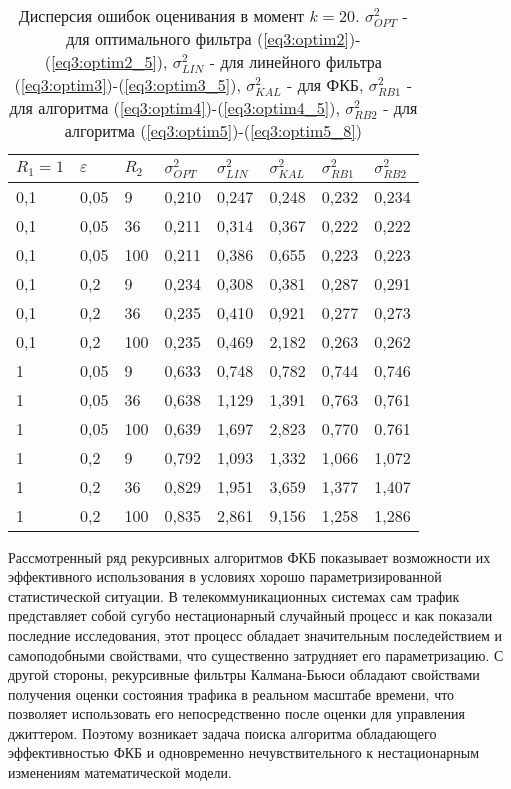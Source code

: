 \begin{table} [h]
  \centering
  \parbox{15cm}{\caption{Дисперсия ошибок оценивания в момент $k=20$. $\sigma_{OPT}^2$ - для оптимального фильтра (\ref{eq3:optim2})-(\ref{eq3:optim2_5}), $\sigma_{LIN}^2$ - для линейного фильтра (\ref{eq3:optim3})-(\ref{eq3:optim3_5}), $\sigma_{KAL}^2$ - для ФКБ, $\sigma_{RB1}^2$ - для алгоритма (\ref{eq3:optim4})-(\ref{eq3:optim4_5}), $\sigma_{RB2}^2$ - для алгоритма (\ref{eq3:optim5})-(\ref{eq3:optim5_8}) \cite{Klekis}} \label{disp_opt}} 
\begin{center}
\begin{tabular}{|l|l|l|l|l|l|l|l|} \hline \hline
$R_1=1$ & $\varepsilon$ & $R_2$ & $\sigma_{OPT}^2$ & $\sigma_{LIN}^2$ & $\sigma_{KAL}^2$ & $\sigma_{RB1}^2$ & $\sigma_{RB2}^2$\\\hline \hline
0,1 & 0,05 & 9 & 0,210 & 0,247 & 0,248 & 0,232 & 0,234\\\hline \hline
0,1 & 0,05 & 36 & 0,211 & 0,314 & 0,367 & 0,222 & 0,222\\\hline
0,1 & 0,05 & 100 & 0,211 & 0,386 & 0,655 & 0,223 & 0,223\\\hline
0,1 & 0,2 & 9 & 0,234 & 0,308 & 0,381 & 0,287 & 0,291\\\hline
0,1 & 0,2 & 36 & 0,235 & 0,410 & 0,921 & 0,277 & 0,273\\\hline
0,1 & 0,2 & 100 & 0,235 & 0,469 & 2,182 & 0,263 & 0,262\\\hline
1 & 0,05 & 9 & 0,633 & 0,748 & 0,782 & 0,744 & 0,746\\\hline
1 & 0,05 & 36 & 0,638 & 1,129 & 1,391 & 0,763 & 0,761\\\hline
1 & 0,05 & 100 & 0,639 & 1,697 & 2,823 & 0,770 & 0.761\\\hline
1 & 0,2 & 9 & 0,792 & 1,093 & 1,332 & 1,066 & 1,072\\\hline
1 & 0,2 & 36 & 0,829 & 1,951 & 3,659 & 1,377 & 1,407\\\hline
1 & 0,2 & 100 & 0,835 & 2,861 & 9,156 & 1,258 & 1,286\\\hline
\end{tabular}
\end{center}
\end{table}

Рассмотренный ряд рекурсивных алгоритмов ФКБ показывает возможности их эффективного использования в условиях хорошо параметризированной статистической ситуации.
В телекоммуникационных системах сам трафик представляет собой сугубо нестационарный случайный процесс и как показали последние исследования, этот процесс обладает значительным последействием и самоподобными свойствами, что существенно затрудняет его параметризацию.
С другой стороны, рекурсивные фильтры Калмана-Бьюси обладают свойствами получения оценки состояния трафика в реальном масштабе времени, что позволяет использовать его непосредственно после оценки для управления джиттером.
Поэтому возникает задача поиска алгоритма обладающего эффективностью ФКБ и одновременно нечувствительного к нестационарным изменениям математической модели.

